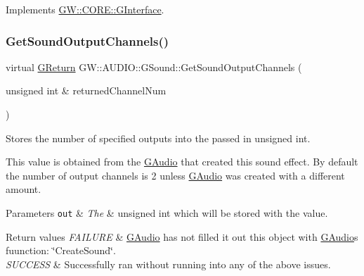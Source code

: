 Implements \mbox{\hyperlink{class_g_w_1_1_c_o_r_e_1_1_g_interface_aacf5834174a7024f8a3c361122ee9e76}{G\+W\+::\+C\+O\+R\+E\+::\+G\+Interface}}.

\mbox{\label{class_g_w_1_1_a_u_d_i_o_1_1_g_sound_a9dcb3529b8819eedfd40e865a3bc611f}} 
\subsubsection{\texorpdfstring{Get\+Sound\+Output\+Channels()}{GetSoundOutputChannels()}}
{\footnotesize\ttfamily virtual \mbox{\hyperlink{namespace_g_w_a67a839e3df7ea8a5c5686613a7a3de21}{G\+Return}} G\+W\+::\+A\+U\+D\+I\+O\+::\+G\+Sound\+::\+Get\+Sound\+Output\+Channels (\begin{DoxyParamCaption}\item[{unsigned int \&}]{returned\+Channel\+Num }\end{DoxyParamCaption})\hspace{0.3cm}{\ttfamily [pure virtual]}}



Stores the number of specified outputs into the passed in unsigned int. 

This value is obtained from the \mbox{\hyperlink{class_g_w_1_1_a_u_d_i_o_1_1_g_audio}{G\+Audio}} that created this sound effect. By default the number of output channels is 2 unless \mbox{\hyperlink{class_g_w_1_1_a_u_d_i_o_1_1_g_audio}{G\+Audio}} was created with a different amount.


\begin{DoxyParams}[1]{Parameters}
\mbox{\tt out}  & {\em The} & unsigned int which will be stored with the value.\\
\hline
\end{DoxyParams}

\begin{DoxyRetVals}{Return values}
{\em F\+A\+I\+L\+U\+RE} & \mbox{\hyperlink{class_g_w_1_1_a_u_d_i_o_1_1_g_audio}{G\+Audio}} has not filled it out this object with \mbox{\hyperlink{class_g_w_1_1_a_u_d_i_o_1_1_g_audio}{G\+Audio}}\textquotesingle{}s fuunction\+: \char`\"{}\+Create\+Sound\char`\"{}. \\
\hline
{\em S\+U\+C\+C\+E\+SS} & Successfully ran without running into any of the above issues. \\
\hline
\end{DoxyRetVals}
\mbox{\label{class_g_w_1_1_a_u_d_i_o_1_1_g_sound_acca8a7684851e32f4022006fd9eacf6c}} 
